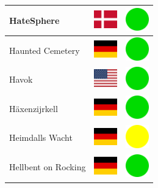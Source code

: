 \documentclass[12pt, a4paper, twoside]{report}
\begin{document}
\begin{center}
\begin{longtable}{|p{5cm}|p{2cm}|p{2cm}|}
 HateSphere                                                 & \includegraphics[width=1cm]{../img/flags/dk} &   \includegraphics[width=1cm]{../likes/y} \\ \hline
 Haunted Cemetery                                           & \includegraphics[width=1cm]{../img/flags/de} &   \includegraphics[width=1cm]{../likes/y} \\ \hline
 Havok                                                      & \includegraphics[width=1cm]{../img/flags/us} &   \includegraphics[width=1cm]{../likes/y} \\ \hline
 Häxenzijrkell                                              & \includegraphics[width=1cm]{../img/flags/de} &   \includegraphics[width=1cm]{../likes/y} \\ \hline
 Heimdalls Wacht                                            & \includegraphics[width=1cm]{../img/flags/de} &   \includegraphics[width=1cm]{../likes/m} \\ \hline
 Hellbent on Rocking                                        & \includegraphics[width=1cm]{../img/flags/de} &   \includegraphics[width=1cm]{../likes/y} \\ \hline

\end{longtable}
\end{center}
\end{document}
